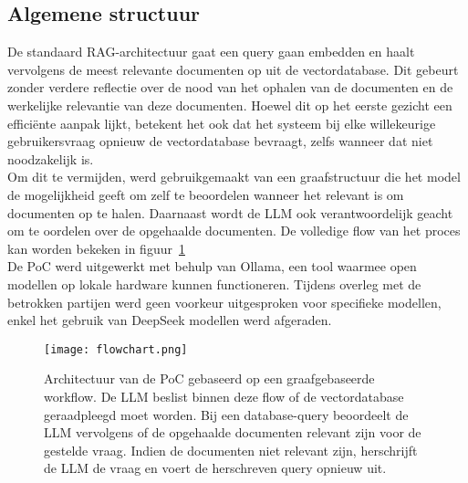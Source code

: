 \subsection{Algemene structuur}

De standaard RAG-architectuur gaat een query gaan embedden en haalt vervolgens de meest relevante documenten op uit de vectordatabase. Dit gebeurt zonder verdere reflectie over de nood van het ophalen van de documenten en de werkelijke relevantie van deze documenten. Hoewel dit op het eerste gezicht een efficiënte aanpak lijkt, betekent het ook dat het systeem bij elke willekeurige gebruikersvraag opnieuw de vectordatabase bevraagt, zelfs wanneer dat niet noodzakelijk is.
\\[1em]
Om dit te vermijden, werd gebruikgemaakt van een graafstructuur die het model de mogelijkheid geeft om zelf te beoordelen wanneer het relevant is om documenten op te halen. Daarnaast wordt de LLM ook verantwoordelijk geacht om te oordelen over de opgehaalde documenten. De volledige flow van het proces kan worden bekeken in figuur~\ref{fig:Architectuur}
\\[1em]
De PoC werd uitgewerkt met behulp van Ollama, een tool waarmee open modellen op lokale hardware kunnen functioneren. Tijdens overleg met de betrokken partijen werd geen voorkeur uitgesproken voor specifieke modellen, enkel het gebruik van DeepSeek modellen werd afgeraden.

\begin{figure}[H]
    \texttt{[image: flowchart.png]}
    \caption{Architectuur van de PoC gebaseerd op een graafgebaseerde workflow. De LLM beslist binnen deze flow of de vectordatabase geraadpleegd moet worden. Bij een database-query beoordeelt de LLM vervolgens of de opgehaalde documenten relevant zijn voor de gestelde vraag. Indien de documenten niet relevant zijn, herschrijft de LLM de vraag en voert de herschreven query opnieuw uit.}
    \label{fig:Architectuur}
\end{figure}



